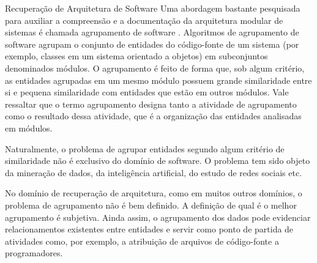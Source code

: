 \begin{section}{Recuperação de Arquitetura de Software}
Uma abordagem bastante pesquisada para auxiliar a compreensão e a documentação da arquitetura modular de sistemas é chamada agrupamento de software \cite{Mancoridis1998,Andritsos2005,Maqbool2007}. Algoritmos de agrupamento de software agrupam o conjunto de entidades do código-fonte de um sistema (por exemplo, classes em um sistema orientado a objetos) em subconjuntos denominados módulos. O agrupamento é feito de forma que, sob algum critério, as entidades agrupadas em um mesmo módulo possuem grande similaridade entre si e pequena similaridade com entidades que estão em outros módulos. Vale ressaltar que o termo agrupamento designa tanto a atividade de agrupamento como o resultado dessa atividade, que é a organização das entidades analisadas em módulos.

Naturalmente, o problema de agrupar entidades segundo algum critério de similaridade não é exclusivo do domínio de software. O problema tem sido objeto da mineração de dados, da inteligência artificial, do estudo de redes sociais etc. %

No domínio de recuperação de arquitetura, como em muitos outros domínios, o problema de agrupamento não é bem definido. A definição de qual é o melhor agrupamento é subjetiva. Ainda assim, o agrupamento dos dados pode evidenciar relacionamentos existentes entre entidades e servir como ponto de partida de atividades como, por exemplo, a atribuição de arquivos de código-fonte a programadores.



\end{section}

